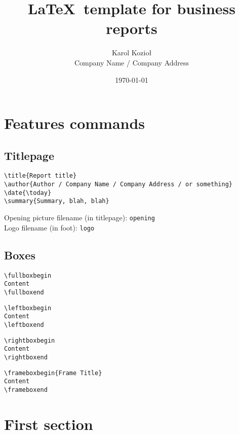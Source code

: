 \documentclass[12pt]{article}
\title{\LaTeX\ template for business reports}
\author{Karol Kozioł\\Company Name / Company Address}
\date{\today}
\begin{document}
\maketitle

\tableofcontents
\clearpage

\section{Features commands}

\subsection{Titlepage}

\begin{verbatim}
\title{Report title}
\author{Author / Company Name / Company Address / or something}
\date{\today}
\summary{Summary, blah, blah}
\end{verbatim}

\noindent
Opening picture filename (in titlepage): \texttt{opening}\\
Logo filename (in foot): \texttt{logo}

\subsection{Boxes}

\begin{verbatim}
\fullboxbegin
Content
\fullboxend
\end{verbatim}

\begin{verbatim}
\leftboxbegin
Content
\leftboxend
\end{verbatim}

\begin{verbatim}
\rightboxbegin
Content
\rightboxend
\end{verbatim}

\begin{verbatim}
\frameboxbegin{Frame Title}
Content
\frameboxend
\end{verbatim}

\newpage

\section{First section}
\lipsum[1]

\fullboxbegin
\lipsum[1]
\fullboxend

\lipsum[1]
\end{document}
